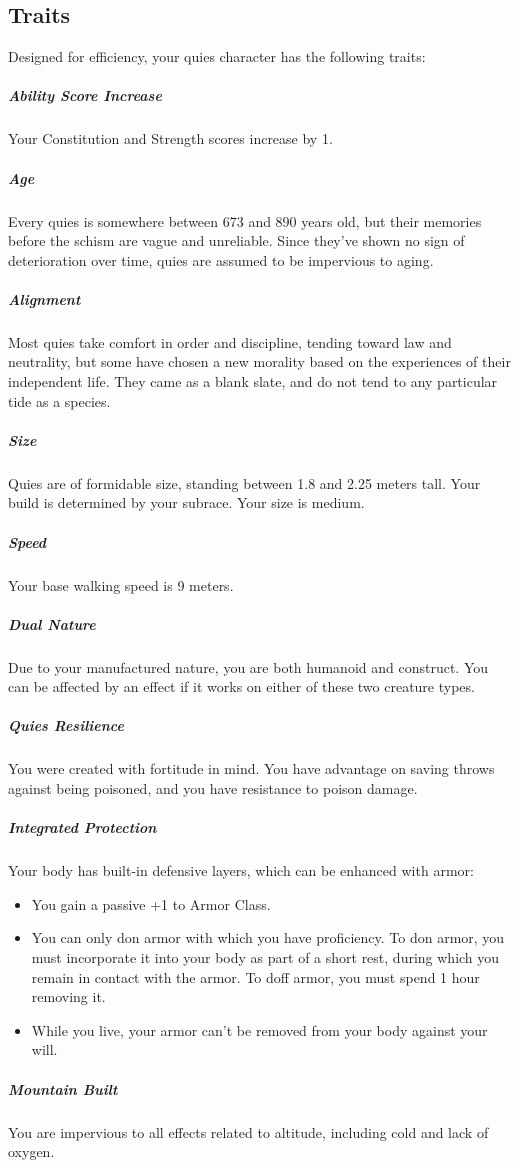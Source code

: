 \subsection*{Traits}
Designed for efficiency, your quies character has the following traits:

\subparagraph{Ability Score Increase} Your Constitution and Strength scores increase by 1.

\subparagraph{Age} Every quies is somewhere between 673 and 890 years old, but their memories before the schism are vague and unreliable.
Since they've shown no sign of deterioration over time, quies are assumed to be impervious to aging.

\subparagraph{Alignment} Most quies take comfort in order and discipline, tending toward law and neutrality, but some have chosen a new morality based on the experiences of their independent life.
They came as a blank slate, and do not tend to any particular tide as a species.

\subparagraph{Size} Quies are of formidable size, standing between 1.8 and 2.25 meters tall.
Your build is determined by your subrace.
Your size is medium.

\subparagraph{Speed} Your base walking speed is 9 meters.

\subparagraph{Dual Nature} Due to your manufactured nature, you are both humanoid and construct.
You can be affected by an effect if it works on either of these two creature types.

\subparagraph{Quies Resilience} You were created with fortitude in mind.
You have advantage on saving throws against being poisoned, and you have resistance to poison damage.

\subparagraph{Integrated Protection} Your body has built-in defensive layers, which can be enhanced with armor:

\begin{itemize}
    \item You gain a passive +1 to Armor Class.
    \item You can only don armor with which you have proficiency.
    To don armor, you must incorporate it into your body as part of a short rest, during which you remain in contact with the armor.
    To doff armor, you must spend 1 hour removing it.
    \item While you live, your armor can't be removed from your body against your will.
\end{itemize}


\subparagraph{Mountain Built} You are impervious to all effects related to altitude, including cold and lack of oxygen.

